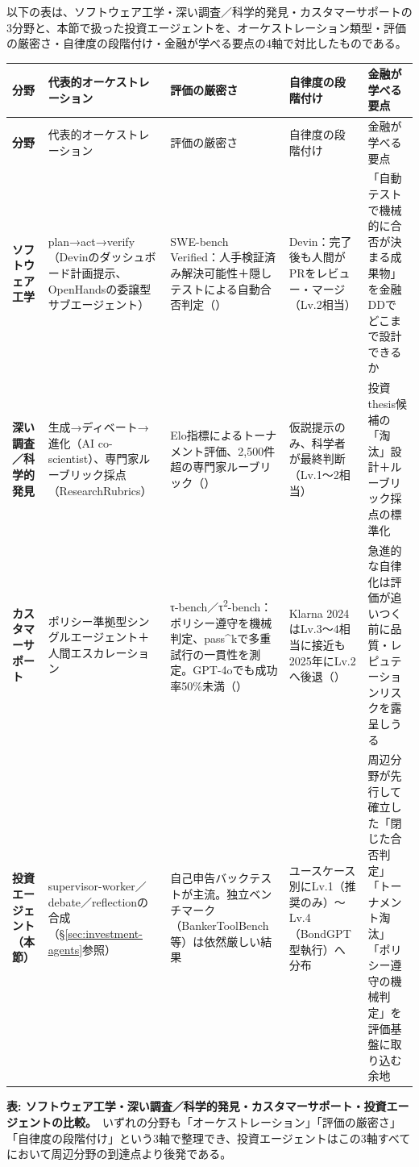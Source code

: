 以下の表は、ソフトウェア工学・深い調査／科学的発見・カスタマーサポートの3分野と、本節で扱った投資エージェントを、オーケストレーション類型・評価の厳密さ・自律度の段階付け・金融が学べる要点の4軸で対比したものである。

\begingroup
\footnotesize
\setlength{\tabcolsep}{4pt}
\begin{longtable}{@{}>{\bfseries}p{2.1cm}p{2.6cm}p{3.4cm}p{2.6cm}p{3.6cm}@{}}
\toprule
分野 & 代表的オーケストレーション & 評価の厳密さ & 自律度の段階付け & 金融が学べる要点\\
\midrule
\endfirsthead
\toprule
分野 & 代表的オーケストレーション & 評価の厳密さ & 自律度の段階付け & 金融が学べる要点\\
\midrule
\endhead
ソフトウェア工学 & plan→act→verify（Devinのダッシュボード計画提示、OpenHandsの委譲型サブエージェント） & SWE-bench Verified：人手検証済み解決可能性＋隠しテストによる自動合否判定（\cite{y04swebench2023,y04swebenchverified2024}） & Devin：完了後も人間がPRをレビュー・マージ（Lv.2相当） & 「自動テストで機械的に合否が決まる成果物」を金融DDでどこまで設計できるか\\
\addlinespace
深い調査／科学的発見 & 生成→ディベート→進化（AI co-scientist）、専門家ルーブリック採点（ResearchRubrics） & Elo指標によるトーナメント評価、2,500件超の専門家ルーブリック（\cite{y04aicoscientist2025,y04researchrubrics2025}） & 仮説提示のみ、科学者が最終判断（Lv.1〜2相当） & 投資thesis候補の「淘汰」設計＋ルーブリック採点の標準化\\
\addlinespace
カスタマーサポート & ポリシー準拠型シングルエージェント＋人間エスカレーション & τ-bench／τ\textsuperscript{2}-bench：ポリシー遵守を機械判定、pass\textasciicircum kで多重試行の一貫性を測定。GPT-4oでも成功率50\%未満（\cite{y04taubench2024,y04tau2bench2025}） & Klarna 2024はLv.3〜4相当に接近も2025年にLv.2へ後退（\cite{y04klarnapress2024,y04klarnawalkback2025}） & 急進的な自律化は評価が追いつく前に品質・レピュテーションリスクを露呈しうる\\
\addlinespace
投資エージェント（本節） & supervisor-worker／debate／reflectionの合成（\S\ref{sec:investment-agents}参照） & 自己申告バックテストが主流。独立ベンチマーク（BankerToolBench等）は依然厳しい結果 & ユースケース別にLv.1（推奨のみ）〜Lv.4（BondGPT型執行）へ分布 & 周辺分野が先行して確立した「閉じた合否判定」「トーナメント淘汰」「ポリシー遵守の機械判定」を評価基盤に取り込む余地\\
\bottomrule
\end{longtable}
\endgroup

\vspace{-1mm}
{\small\color{figgray}\textbf{表: ソフトウェア工学・深い調査／科学的発見・カスタマーサポート・投資エージェントの比較。}\
いずれの分野も「オーケストレーション」「評価の厳密さ」「自律度の段階付け」という3軸で整理でき、投資エージェントはこの3軸すべてにおいて周辺分野の到達点より後発である。}

